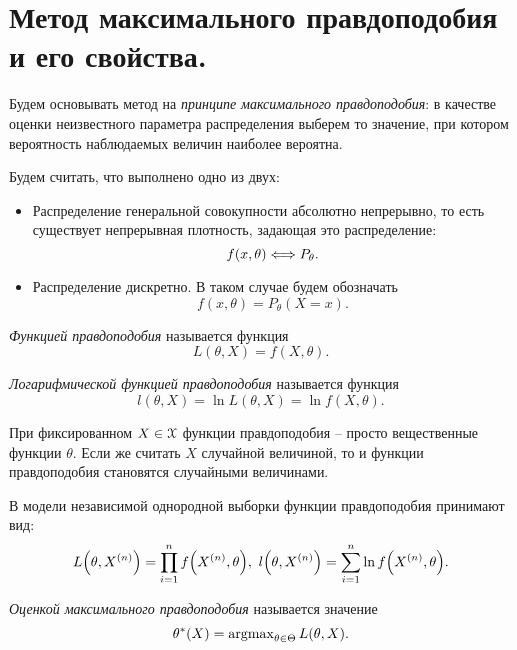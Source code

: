 \section{Метод максимального правдоподобия и его свойства.}

Будем основывать метод на \textit{принципе максимального правдоподобия}:
в качестве оценки неизвестного параметра распределения выберем то значение,
при котором вероятность наблюдаемых величин наиболее вероятна.

Будем считать, что выполнено одно из двух:
\begin{itemize}
    \item Распределение генеральной совокупности абсолютно непрерывно, то
        есть существует непрерывная плотность, задающая это распределение:
        \[
            f(x, \theta) \Longleftrightarrow P_\theta
        .\]
    \item Распределение дискретно. В таком случае будем обозначать
        \[
            f(x, \theta) = P_\theta(X = x)
        .\]
\end{itemize}

\begin{definition}
    \textit{Функцией правдоподобия} называется функция
    \[
        L(\theta, X) = f(X, \theta)
    .\]
\end{definition}

\begin{definition}
    \textit{Логарифмической функцией правдоподобия} называется функция
    \[
        l(\theta, X) = \ln{L(\theta, X)} = \ln{f(X, \theta)}
    .\]
\end{definition}

\begin{remark}
    При фиксированном $X \in \mathcal{X}$ функции правдоподобия -- просто вещественные
    функции $\theta$. Если же считать $X$ случайной величиной, то
    и функции правдоподобия становятся случайными величинами.
\end{remark}

\begin{remark}
    В модели независимой однородной выборки функции правдоподобия принимают вид:
    \[
        L\parens*{\theta, X^{(n)}} = \prod_{i = 1}^n{f\parens*{X^{(n)}, \theta}},~
        l\parens*{\theta, X^{(n)}} = \sum_{i = 1}^n{\ln{f\parens*{X^{(n)}, \theta}}}
    .\]
\end{remark}

\begin{definition}
    \textit{Оценкой максимального правдоподобия} называется значение
    \[
        \theta^*(X) = \operatorname{argmax}_{\theta \in \Theta}{L(\theta, X)}
    .\]
\end{definition}

